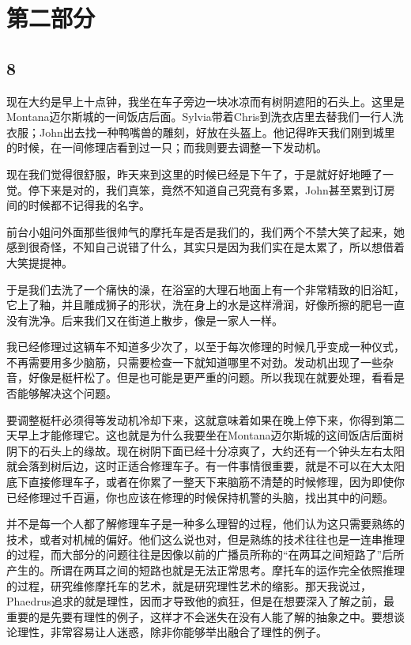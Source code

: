 \documentclass[UTF8]{article}
\begin{document}
\section*{第二部分}
\subsection*{8}
\par 现在大约是早上十点钟，我坐在车子旁边一块冰凉而有树阴遮阳的石头上。这里是Montana迈尔斯城的一间饭店后面。Sylvia带着Chris到洗衣店里去替我们一行人洗衣服；John出去找一种鸭嘴兽的雕刻，好放在头盔上。他记得昨天我们刚到城里的时候，在一间修理店看到过一只；而我则要去调整一下发动机。
\par 现在我们觉得很舒服，昨天来到这里的时候已经是下午了，于是就好好地睡了一觉。停下来是对的，我们真笨，竟然不知道自己究竟有多累，John甚至累到订房间的时候都不记得我的名字。
\par 前台小姐问外面那些很帅气的摩托车是否是我们的，我们两个不禁大笑了起来，她感到很奇怪，不知自己说错了什么，其实只是因为我们实在是太累了，所以想借着大笑提提神。
\par 于是我们去洗了一个痛快的澡，在浴室的大理石地面上有一个非常精致的旧浴缸，它上了釉，并且雕成狮子的形状，洗在身上的水是这样滑润，好像所擦的肥皂一直没有洗净。后来我们又在街道上散步，像是一家人一样。
\par 我已经修理过这辆车不知道多少次了，以至于每次修理的时候几乎变成一种仪式，不再需要用多少脑筋，只需要检查一下就知道哪里不对劲。发动机出现了一些杂音，好像是梃杆松了。但是也可能是更严重的问题。所以我现在就要处理，看看是否能够解决这个问题。
\par 要调整梃杆必须得等发动机冷却下来，这就意味着如果在晚上停下来，你得到第二天早上才能修理它。这也就是为什么我要坐在Montana迈尔斯城的这间饭店后面树阴下的石头上的缘故。现在树阴下面已经十分凉爽了，大约还有一个钟头左右太阳就会落到树后边，这时正适合修理车子。有一件事情很重要，就是不可以在大太阳底下直接修理车子，或者在你累了一整天下来脑筋不清楚的时候修理，因为即使你已经修理过千百遍，你也应该在修理的时候保持机警的头脑，找出其中的问题。
\par 并不是每一个人都了解修理车子是一种多么理智的过程，他们认为这只需要熟练的技术，或者对机械的偏好。他们这么说也对，但是熟练的技术往往也是一连串推理的过程，而大部分的问题往往是因像以前的广播员所称的“在两耳之间短路了”后所产生的。所谓在两耳之间的短路也就是无法正常思考。摩托车的运作完全依照推理的过程，研究维修摩托车的艺术，就是研究理性艺术的缩影。那天我说过，Phaedrus追求的就是理性，因而才导致他的疯狂，但是在想要深入了解之前，最重要的是先要有理性的例子，这样才不会迷失在没有人能了解的抽象之中。要想谈论理性，非常容易让人迷惑，除非你能够举出融合了理性的例子。
\end{document}
